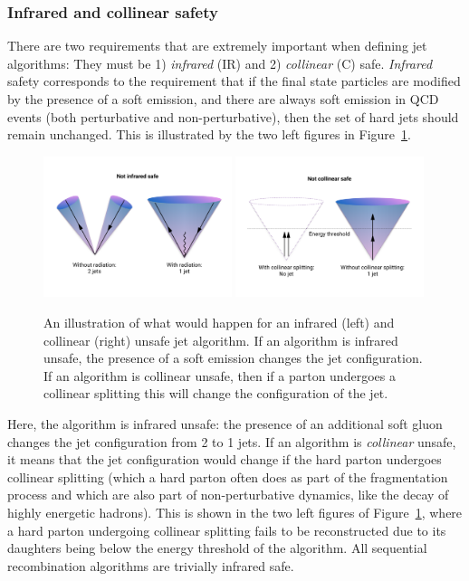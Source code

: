\subsubsection{Infrared and collinear safety}
There are two requirements that are extremely important when defining jet algorithms: They must be 1) \textit{infrared} (IR) and 2) \textit{collinear} (C) safe.
\textit{Infrared} safety corresponds to the requirement that if the final state particles are modified by the presence of a soft emission, and there are always soft emission in QCD events (both perturbative and non-perturbative), then the set of hard jets should remain unchanged. This is illustrated by the two left figures in Figure~\ref{fig:objreco:IRC}.
\begin{figure}[h!] 
    \centering
    \includegraphics[width=0.49\textwidth]{figures/event_reconstruction/IR_safety.pdf}
    \includegraphics[width=0.49\textwidth]{figures/event_reconstruction/Collinear_safety.pdf}
    \caption{An illustration of what would happen for an infrared (left) and collinear (right) unsafe jet algorithm. If an algorithm is infrared unsafe, the presence of a soft emission changes the jet configuration. If an algorithm is collinear unsafe, then if a parton undergoes a collinear splitting this will change the configuration of the jet.}
    \label{fig:objreco:IRC}
\end{figure}
Here, the algorithm is infrared unsafe: the presence of an additional soft gluon changes the jet configuration from 2 to 1 jets. If an algorithm is \textit{collinear} unsafe, it means that the jet configuration would change if the hard parton undergoes collinear splitting (which a hard parton often does as part of the fragmentation process and which are also part of non-perturbative dynamics, like the decay of highly energetic hadrons). This is shown in the two left figures of Figure~\ref{fig:objreco:IRC}, where a hard parton undergoing collinear splitting fails to be reconstructed due to its daughters being below the energy threshold of the algorithm. All sequential recombination algorithms are trivially infrared safe.
 
